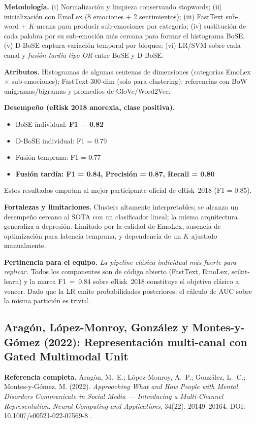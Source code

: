 \documentclass[journal]{IEEEtran}
\begin{document}
\textbf{Metodología.} (i) Normalización y limpieza conservando stopwords; (ii) inicialización con EmoLex (8 emociones + 2 sentimientos); (iii) FastText sub-word + $K$-means para producir sub-emociones por categoría; (iv) sustitución de cada palabra por su sub-emoción más cercana para formar el histograma BoSE; (v) D-BoSE captura variación temporal por bloques; (vi) LR/SVM sobre cada canal y \emph{fusión tardía tipo OR} entre BoSE y D-BoSE.

\textbf{Atributos.} Histogramas de algunas centenas de dimensiones (categorías EmoLex $\times$ sub-emociones); FastText 300-dim (solo para clustering); referencias con BoW unigramas/bigramas y promedios de GloVe/Word2Vec.

\textbf{Desempeño (eRisk 2018 anorexia, clase positiva).}
\begin{itemize}
    \item BoSE individual: \textbf{F1 = 0.82}
    \item D-BoSE individual: F1 = 0.79
    \item Fusión temprana: F1 = 0.77
    \item \textbf{Fusión tardía: F1 = 0.84, Precisión = 0.87, Recall = 0.80}
\end{itemize}
Estos resultados empatan al mejor participante oficial de eRisk~2018 (F1 = 0.85).

\textbf{Fortalezas y limitaciones.} Clusters altamente interpretables; se alcanza un desempeño cercano al SOTA con un clasificador lineal; la misma arquitectura generaliza a depresión. Limitado por la calidad de EmoLex, ausencia de optimización para latencia temprana, y dependencia de un $K$ ajustado manualmente.

\textbf{Pertinencia para el equipo.} \emph{La pipeline clásica individual más fuerte para replicar.} Todos los componentes son de código abierto (FastText, EmoLex, scikit-learn) y la marca F1~=~0.84 sobre eRisk~2018 constituye el objetivo clásico a vencer. Dado que la LR emite probabilidades posteriores, el cálculo de AUC sobre la misma partición es trivial.

\subsection{Aragón, López-Monroy, González y Montes-y-Gómez (2022): Representación multi-canal con Gated Multimodal Unit}

\textbf{Referencia completa.} Aragón, M.~E.; López-Monroy, A.~P.; González, L.~C.; Montes-y-Gómez, M. (2022). \emph{Approaching What and How People with Mental Disorders Communicate in Social Media --- Introducing a Multi-Channel Representation}. \textit{Neural Computing and Applications}, 34(22), 20149--20164. DOI: 10.1007/s00521-022-07569-8 \cite{aragon2022multichannel}.
\end{document}
